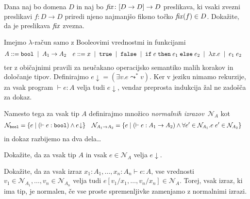 \documentclass[arhiv]{izpit}
\begin{document}

\naloga[\tocke{20}]
Dana naj bo domena $D$ in naj bo $\mathit{fix} \colon [D \to D] \to D$ preslikava, ki vsaki zvezni preslikavi $f \colon D \to D$ priredi njeno najmanjšo fiksno točko $\mathit{fix}(f) \in D$. Dokažite, da je preslikava $\mathit{fix}$ zvezna.


\naloga[\tocke{20}]
\newcommand{\norm}[1]{\mathcal{N}_{#1}}
\newcommand{\conv}[1]{{#1 \! \downarrow}}
Imejmo $\lambda$-račun samo z Booleovimi vrednostmi in funkcijami
\begin{align*}
  A &\mathrel{{:}{:}{=}}
  \mathtt{bool} \;\mid\;
  A_1 \to A_2 &
  e &\mathrel{{:}{:}{=}}
  x \;\mid\;
  \mathtt{true} \;\mid\;
  \mathtt{false} \;\mid\;
  \mathtt{if}\;e\;\mathtt{then}\;e_1\;\mathtt{else}\;e_2 \;\mid\;
  \lambda x. e \;\mid\;
  e_1 \; e_2
\end{align*}
ter z običajnimi pravili za neučakano operacijsko semantiko malih korakov in določanje tipov.
Definirajmo $\conv{e} = (\exists v. e \leadsto^* v)$.
Ker v jeziku nimamo rekurzije, za vsak program $\vdash e : A$ velja tudi $\conv{e}$, vendar preprosta indukcija žal ne zadošča za dokaz.

Namesto tega za vsak tip $A$ definirajmo množico \emph{normalnih izrazov}~$\norm{A}$ kot
\begin{align*}
  \norm{\boolty} &=
    \{ e \mid (\vdash e : \boolty) \land \conv{e} \} &
  \norm{\funty{A_1}{A_2}} &=
    \{ e \mid (\vdash e : \funty{A_1}{A_2}) \land \forall e' \in \norm{A_1}. e \; e' \in \norm{A_2} \}
\end{align*}
in dokaz razbijemo na dva dela\ldots

\podnaloga
Dokažite, da za vsak tip $A$ in vsak $e \in \norm{A}$ velja $\conv{e}$.

\podnaloga
Dokažite, da za vsak izraz $x_1 : A_1, \dots, x_n : A_n \vdash e : A$, vse vrednosti $v_1 \in \norm{A_1}, \dots, v_n \in \norm{A_n}$ velja tudi $e[v_1 / x_1, \dots, v_n / x_n] \in \norm{A}$. Torej, vsak izraz, ki ima tip, je normalen, če vse proste spremenljivke zamenjamo z normalnimi izrazi.
\end{document}
